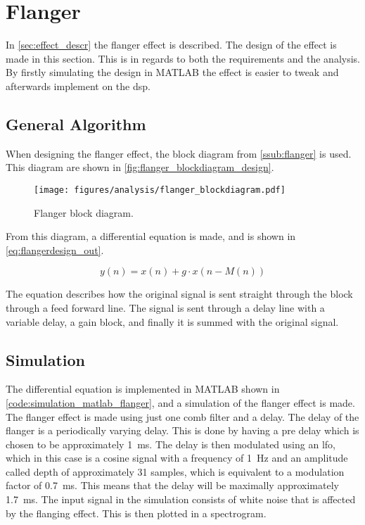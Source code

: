 \section{Flanger}
\label{sec:flanger_design}
In \autoref{sec:effect_descr} the flanger effect is described. The design of the effect is made in this section. This is in regards to both the requirements and the analysis. By firstly simulating the design in MATLAB the effect is easier to tweak and afterwards implement on the \gls{dsp}.

\subsection{General Algorithm}

When designing the flanger effect, the block diagram from \autoref{ssub:flanger} is used. This diagram are shown in \autoref{fig:flanger_blockdiagram_design}.


\begin{figure}[htbp]
	\centering
	\texttt{[image: figures/analysis/flanger\_blockdiagram.pdf]}
	\caption{Flanger block diagram.}
	\label{fig:flanger_blockdiagram_design}
\end{figure}

From this diagram, a differential equation is made, and is shown in \autoref{eq:flangerdesign_out}.

\begin{equation}
	y(n)=x(n)+g \cdot x(n-M(n))
	\label{eq:flangerdesign_out}
\end{equation}

The equation describes how the original signal is sent straight through the block through a feed forward line. The signal is sent through a delay line with a variable delay, a gain block, and finally it is summed with the original signal.

\subsection{Simulation}

The differential equation is implemented in MATLAB shown in \autoref{code:simulation_matlab_flanger}, and a simulation of the flanger effect is made. The flanger effect is made using just one comb filter and a delay. The delay of the flanger is a periodically varying delay. This is done by having a pre delay which is chosen to be approximately \SI{1}{\milli \second}. The delay is then modulated using an \gls{lfo}, which in this case is a cosine signal with a frequency of \SI{1}{\hertz} and an amplitude called depth of approximately 31 samples, which is equivalent to a modulation factor of \SI{0.7}{\milli \second}. This means that the delay will be maximally approximately \SI{1.7}{\milli \second}. The input signal in the simulation consists of white noise that is affected by the flanging effect. This is then plotted in a spectrogram.

